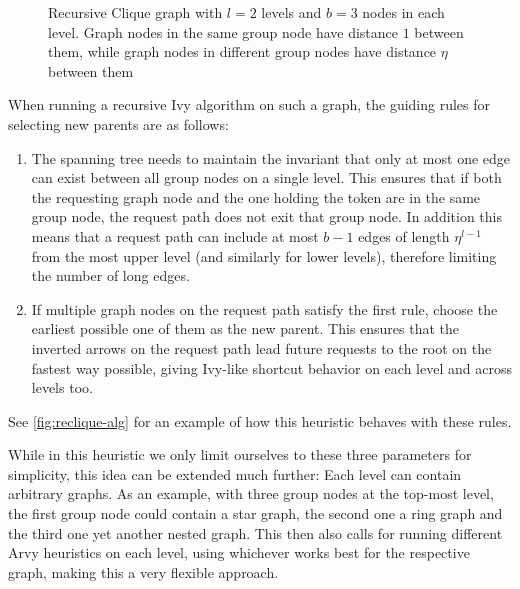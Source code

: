 \documentclass[a4paper, oneside]{discothesis}
\begin{document}
\begin{figure}[H]
\caption{Recursive Clique graph with $l=2$ levels and $b=3$ nodes in each level. Graph nodes in the same group node have distance $1$ between them, while graph nodes in different group nodes have distance $\eta$ between them}
\label{fig:reclique}
\end{figure}

When running a recursive Ivy algorithm on such a graph, the guiding rules for selecting new parents are as follows:
\begin{enumerate}
\item\label{reclique-invariant} The spanning tree needs to maintain the invariant that only at most one edge can exist between all group nodes on a single level. This ensures that if both the requesting graph node and the one holding the token are in the same group node, the request path does not exit that group node. In addition this means that a request path can include at most $b-1$ edges of length $\eta^{l-1}$ from the most upper level (and similarly for lower levels), therefore limiting the number of long edges.
\item If multiple graph nodes on the request path satisfy the first rule, choose the earliest possible one of them as the new parent. This ensures that the inverted arrows on the request path lead future requests to the root on the fastest way possible, giving Ivy-like shortcut behavior on each level and across levels too.
\label{reclique-rule-early}
\end{enumerate}

See \autoref{fig:reclique-alg} for an example of how this heuristic behaves with these rules.

While in this heuristic we only limit ourselves to these three parameters for simplicity, this idea can be extended much further: Each level can contain arbitrary graphs. As an example, with three group nodes at the top-most level, the first group node could contain a star graph, the second one a ring graph and the third one yet another nested graph. This then also calls for running different Arvy heuristics on each level, using whichever works best for the respective graph, making this a very flexible approach.
\end{document}
